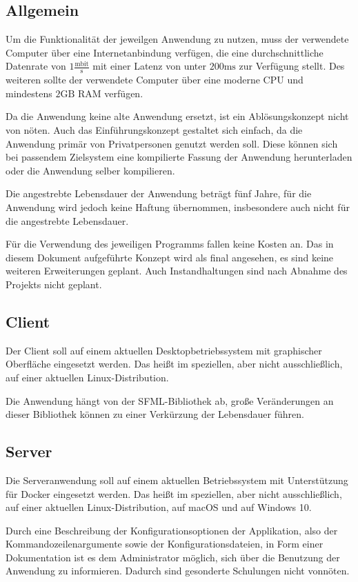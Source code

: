 \subsection{Allgemein}
Um die Funktionalität der jeweilgen Anwendung zu nutzen, muss der verwendete Computer über eine Internetanbindung verfügen, die eine durchschnittliche Datenrate von $1 \frac{\text{mbit}}{\text{s}}$ mit einer Latenz von unter $200\text{ms}$ zur Verfügung stellt. Des weiteren sollte der verwendete Computer über eine moderne CPU und mindestens $2\text{GB}$ RAM verfügen.

Da die Anwendung keine alte Anwendung ersetzt, ist ein Ablösungskonzept nicht von nöten. Auch das Einführungskonzept gestaltet sich einfach, da die Anwendung primär von Privatpersonen genutzt werden soll. Diese können sich bei passendem Zielsystem eine kompilierte Fassung der Anwendung herunterladen oder die Anwendung selber kompilieren.

Die angestrebte Lebensdauer der Anwendung beträgt fünf Jahre, für die Anwendung wird jedoch keine Haftung übernommen, insbesondere auch nicht für die angestrebte Lebensdauer.

Für die Verwendung des jeweiligen Programms fallen keine Kosten an. Das in diesem Dokument aufgeführte Konzept wird als final angesehen, es sind keine weiteren Erweiterungen geplant. Auch Instandhaltungen sind nach Abnahme des Projekts nicht geplant.

\subsection{Client}
Der Client soll auf einem aktuellen Desktopbetriebssystem mit graphischer Oberfläche eingesetzt werden. Das heißt im speziellen, aber nicht ausschließlich, auf einer aktuellen Linux-Distribution.

Die Anwendung hängt von der SFML-Bibliothek ab, große Veränderungen an dieser Bibliothek können zu einer Verkürzung der Lebensdauer führen.

\subsection{Server}
Die Serveranwendung soll auf einem aktuellen Betriebssystem mit Unterstützung für Docker eingesetzt werden. Das heißt im speziellen, aber nicht ausschließlich, auf einer aktuellen Linux-Distribution, auf macOS und auf Windows 10.

Durch eine Beschreibung der Konfigurationsoptionen der Applikation, also der Kommandozeilenargumente sowie der Konfigurationsdateien, in Form einer Dokumentation ist es dem Administrator möglich, sich über die Benutzung der Anwendung zu informieren. Dadurch sind gesonderte Schulungen nicht vonnöten.

